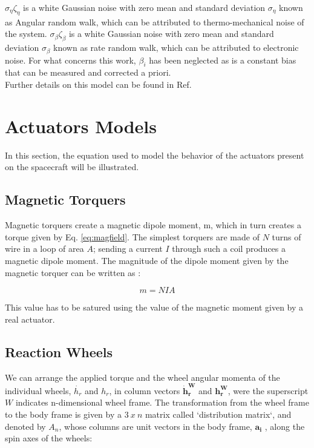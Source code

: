 \documentclass[11pt,a4paper]{report}
\begin{document}
$\sigma_{\eta} \zeta_{\eta}$ is a white Gaussian noise with zero mean and standard deviation $\sigma_{\eta}$ known as Angular random walk, which can be attributed to thermo-mechanical noise of the system.
$\sigma_{\beta} \zeta_{\beta}$ is a white Gaussian noise with zero mean and standard deviation $\sigma_{\beta}$ known as rate random walk, which can be attributed to electronic noise.
For what concerns this work, $\beta_{i}$ has been neglected as is a constant bias that can be measured and corrected a priori.\\
Further details on this model can be found in Ref. \cite{Ref:Books:wertz}

\section{Actuators Models}
In this section, the equation used to model the behavior of the actuators present on the spacecraft will be illustrated.

\subsection{Magnetic Torquers}
Magnetic torquers create a magnetic dipole moment, m, which in turn creates a torque given by Eq. \ref{eq:magfield}. 
The simplest torquers are made of $N$ turns of wire in a loop of area $A$; sending a current $I$ through such a coil produces a magnetic dipole moment.
The magnitude of the dipole moment given by the magnetic torquer can be written as :

\begin{equation}
 m = NIA
\end{equation}

This value has to be satured using the value of the magnetic moment given by a real actuator.

\subsection{Reaction Wheels}
We can arrange the applied torque and the wheel angular momenta of the individual wheels, $\dot{h_{r}}$ and $h_{r}$, in column vectors $\mathbf{\dot{h}_{r}^W}$ and $\mathbf{{h_{r}^W}}$, were the superscript $W$ indicates n-dimensional wheel frame. The transformation from the wheel frame to the body frame is given by a $3 \ x \ n$ matrix called `distribution matrix`, and denoted by $\mathit{A_{n}}$, whose columns are unit vectors in the body frame, $\mathbf{a_{i}}$ , along the spin axes of the wheels:
\end{document}
